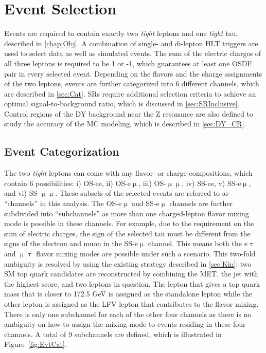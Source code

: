\chapter{Event Selection}
\label{chap:Evt}

Events are required to contain exactly two \emph{tight} leptons and one \emph{tight} tau, described in \autoref{chap:Obj}. A combination of single- and di-lepton \ac{HLT} triggers are used to select data as well as simulated events. The sum of the electric charges of all three leptons is required to be 1 or -1, which guarantees at least one \ac{OSDF} pair in every selected event. Depending on the flavors and the charge assignments of the two leptons, events are further categorized into 6 different channels, which are described in \autoref{sec:Cat}. \acp{SR} require additional selection criteria to achieve an optimal signal-to-background ratio, which is discussed in \autoref{sec:SRInclusive}. Control regions of the \ac{DY} background near the Z resonance are also defined to study the accuracy of the \ac{MC} modeling, which is described in \autoref{sec:DY_CR}. 
\section{Event Categorization}
\label{sec:Cat}

The two \emph{tight} leptons can come with any flavor- or charge-compositions, which contain 6 possibilities: i) \ac{OS}-ee, ii) \ac{OS}-e$\upmu$, iii) \ac{OS}-$\upmu\upmu$, iv) \ac{SS}-ee, v) \ac{SS}-e$\upmu$, and vi) \ac{SS}-$\upmu\upmu$. These subsets of the selected events are referred to as ``channels'' in this analysis. The \ac{OS}-e$\upmu$ and \ac{SS}-e$\upmu$ channels are further subdivided into ``subchannels'' as more than one charged-lepton flavor mixing mode is possible in these channels. For example, due to the requirement on the sum of electric charges, the sign of the selected tau must be different from the signs of the electron and muon in the \ac{SS}-e$\upmu$ channel. This means both the e$\uptau$ and $\upmu\uptau$ flavor mixing modes are possible under such a scenario. This two-fold ambiguity is resolved by using the existing strategy described in \autoref{sec:Kin}: two \ac{SM} top quark candidates are reconstructed by combining the \ac{MET}, the jet with the highest \DeepJ score, and two leptons in question. The lepton that gives a top quark mass that is closer to 172.5 GeV is assigned as the standalone lepton while the other lepton is assigned as the LFV lepton that contributes to the flavor mixing. There is only one subchannel for each of the other four channels as there is no ambiguity on how to assign the mixing mode to events residing in these four channels. A total of 9 subchannels are defined, which is illustrated in Figure~\ref{fig:EvtCat}. 


